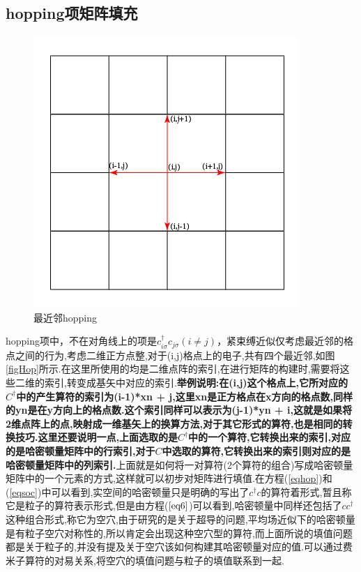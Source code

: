 \documentclass[a4paper,12pt]{ctexart}
\numberwithin{equation}{section}
\begin{document}
\subsection{hopping项矩阵填充}
\begin{figure}[h]
\centering
\includegraphics[scale=0.8]{SqLattice.png}
\caption{最近邻hopping}
\end{figure}\label{figHop}
hopping项中，不在对角线上的项是$c_{i\sigma}^\dagger c_{j\sigma}(i\neq j)$，紧束缚近似仅考虑最近邻的格点之间的行为,考虑二维正方点整,对于(i,j)格点上的电子,共有四个最近邻,如图\ref{figHop}所示.在这里所使用的均是二维点阵的索引,在进行矩阵的构建时,需要将这些二维的索引,转变成基矢中对应的索引.\textbf{举例说明:在(i,j)这个格点上,它所对应的$C^\dagger$中的产生算符的索引为(i-1)*xn + j,这里xn是正方格点在x方向的格点数,同样的yn是在y方向上的格点数.这个索引同样可以表示为(j-1)*yn + i,这就是如果将2维点阵上的点,映射成一维基矢上的换算方法,对于其它形式的算符,也是相同的转换技巧.这里还要说明一点,上面选取的是$C^\dagger$中的一个算符,它转换出来的索引,对应的是哈密顿量矩阵中的行索引,对于$C$中选取的算符,它转换出来的索引则对应的是哈密顿量矩阵中的列索引.}上面就是如何将一对算符(2个算符的组合)写成哈密顿量矩阵中的一个元素的方式,这样就可以初步对矩阵进行填值.在方程(\ref{eqhop})和(\ref{eqsoc})中可以看到,实空间的哈密顿量只是明确的写出了$c^\dagger c$的算符着形式,暂且称它是粒子的算符表示形式,但是由方程($\ref{eq6}$)可以看到,哈密顿量中同样还包括了$cc^\dagger$这种组合形式,称它为空穴,由于研究的是关于超导的问题,平均场近似下的哈密顿量是有粒子空穴对称性的,所以肯定会出现这种空穴型的算符,而上面所说的填值问题都是关于粒子的,并没有提及关于空穴该如何构建其哈密顿量对应的值.可以通过费米子算符的对易关系,将空穴的填值问题与粒子的填值联系到一起.
\end{document}

